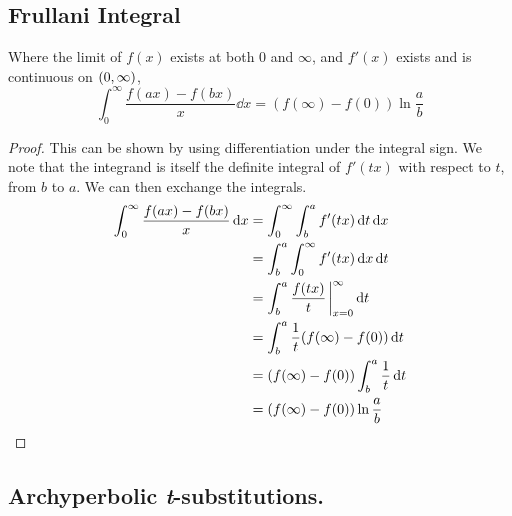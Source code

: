 \subsection{Frullani Integral}

\begin{theorem}
Where the limit of \(f(x)\) exists at both 0 and \(\infty\), and \(f'(x)\)
exists and is continuous on \((0, \infty)\),
\begin{equation*}
\int_0^\infty \frac{f(ax) - f(bx)} x \dd{x}
    = (f(\infty) - f(0))\ln \frac ab
\end{equation*}
\end{theorem}
\begin{proof}
This can be shown by using differentiation under the integral sign. We note
that the integrand is itself the definite integral of \(f'(tx)\) with
respect to \(t\), from \(b\) to \(a\). We can then exchange the integrals.
\begin{align*}
\int_0^\infty \frac{f(ax) - f(bx)} x \dd{x} &=
    \int_0^\infty \int_b^a f'(tx) \dd{t} \dd{x} \\
    &= \int_b^a \int_0^\infty f'(tx) \dd{x} \dd{t} \\
    &= \int_b^a \frac{f(tx)}{t}\eval_{x=0}^\infty \dd{t} \\
    &= \int_b^a \frac 1t(f(\infty) - f(0)) \dd{t} \\
    &= (f(\infty) - f(0))\int_b^a \frac 1t \dd{t} \\
    &= (f(\infty) - f(0))\ln \frac ab \qedhere
\end{align*}
\end{proof}

\subsection{Archyperbolic \textit t-substitutions.}

